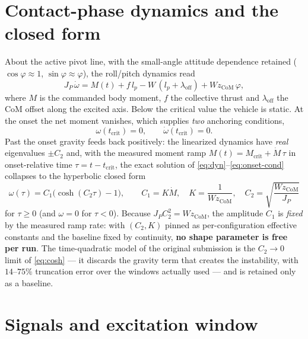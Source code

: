 \documentclass[10pt]{article}
\begin{document}
\section{Contact-phase dynamics and the closed form}
\label{sec:closedform}

About the active pivot line, with the small-angle attitude dependence
retained ($\cos\varphi \approx 1$, $\sin\varphi \approx \varphi$), the
roll/pitch dynamics read
\begin{equation}
J_P\,\dot\omega
 = M(t) + f\,l_p - W\,(l_p + \lambda_{\mathrm{off}}) + W z_{\mathrm{CoM}}\,\varphi ,
\label{eq:dyn}
\end{equation}
where $M$ is the commanded body moment, $f$ the collective thrust and
$\lambda_{\mathrm{off}}$ the CoM offset along the excited axis. Below the
critical value the vehicle is static. At the onset the net moment
vanishes, which supplies \emph{two} anchoring conditions,
\begin{equation}
\omega(t_{\mathrm{crit}}) = 0, \qquad \dot\omega(t_{\mathrm{crit}}) = 0 .
\label{eq:onset-cond}
\end{equation}
Past the onset gravity feeds back positively: the linearized dynamics have
\emph{real} eigenvalues $\pm C_2$ and, with the measured moment ramp
$M(t) = M_{\mathrm{crit}} + \dot M\,\tau$ in onset-relative time
$\tau = t - t_{\mathrm{crit}}$, the exact solution of
\eqref{eq:dyn}--\eqref{eq:onset-cond} collapses to the hyperbolic
closed form
\begin{equation}
\boxed{\;\omega(\tau) = C_1\bigl(\cosh(C_2\tau) - 1\bigr), \qquad
C_1 = K\dot M,\quad K = \frac{1}{W z_{\mathrm{CoM}}},\quad
C_2 = \sqrt{\frac{W z_{\mathrm{CoM}}}{J_P}} \; }
\label{eq:cosh}
\end{equation}
for $\tau \ge 0$ (and $\omega = 0$ for $\tau < 0$). Because
$J_P C_2^2 = W z_{\mathrm{CoM}}$, the amplitude $C_1$ is \emph{fixed} by
the measured ramp rate: with $(C_2, K)$ pinned as per-configuration
effective constants and the
baseline fixed by continuity, \textbf{no shape parameter is free per run}.
The time-quadratic model of the original submission is the $C_2 \to 0$
limit of \eqref{eq:cosh} — it discards the gravity term that creates the
instability, with $14$--$75\%$ truncation error over the windows actually
used — and is retained only as a baseline.

\section{Signals and excitation window}
\label{sec:window}
\end{document}
